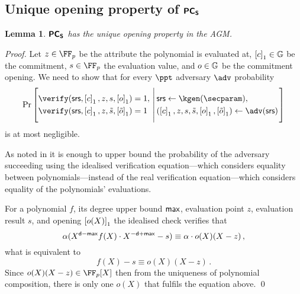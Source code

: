 \documentclass[runningheads,11pt]{llncs}
\newtheorem{lemma}[theorem]{Lemma} \newtheorem{corollary}[theorem]{Corollary}
\theoremstyle{definition} \newtheorem{definition}[theorem]{Definition}
\begin{document}
\subsection{Unique opening property of $\bm{\mathsf{PC}}_{\bm{\mathsf{S}}}$}
\begin{lemma}
\label{lem:pcoms_unique_op}
$\bm{\mathsf{PC}}_{\bm{\mathsf{S}}}$ has the unique opening property in the AGM. 
\end{lemma}
\begin{proof}
Let 
$z \in \FF_p$ be the attribute the polynomial is evaluated at,
$\left[c\right]_{1} \in \mathbb{G}$ be the commitment,  
$s \in \FF_p$ the evaluation value, and 
$o \in \mathbb{G}$ be the commitment opening. 
We need to show that for every $\ppt$ adversary $\adv$ probability
\[
  \Pr \left[
    \begin{aligned}
      & \verify(\srs, \gone{c}, z, s, \gone{o}) = 1, \\
      & \verify(\srs, \gone{c}, z, \tilde{s}, \gone{\tilde{o}}) = 1
    \end{aligned}
    \,\left|\, \vphantom{\begin{aligned}
          & \verify(\srs, \gone{c}, z, s, \gone{o}),\\
          & \verify(\srs, \gone{c}, z, \tilde{s}, \gone{\tilde{o}}) \\
          &o \neq \tilde{o})
		\end{aligned}}
      \begin{aligned}
        & \srs \gets \kgen(\secparam), \\
        & (\gone{c}, z, s, \tilde{s}, \gone{o}, \gone{\tilde{o}}) \gets \adv(\srs)
      \end{aligned}
    \right.\right]
\]
is at most negligible.

As noted in \cite[Lemma 2.2]{EPRINT:GabWilCio19} it is enough to upper bound the
probability of the adversary succeeding using the idealised verification
equation---which considers equality between polynomials---instead of the real
verification equation---which considers equality of the polynomials' evaluations.

For a polynomial $f$, its degree upper bound $\mathsf{max}$, evaluation point $z$,
evaluation result $s$, and opening $\left[o(X)\right]_{1}$ the idealised check verifies that
\begin{equation}
  \alpha (X^{\mathsf{d} - \mathsf{max}}f(X) \cdot X^{-\mathsf{d} + \mathsf{max}} -  s) \equiv \alpha \cdot o(X) (X - z)\,,
\end{equation}
what is equivalent to 
\begin{equation}
	f(X) -  s \equiv o(X) (X - z)\,.
	\label{eq:pcoms_idealised_check}
\end{equation}
Since $o(X)(X - z) \in \FF_p[X]$ then from the uniqueness of polynomial
composition, there is only one $o(X)$ that fulfils the equation above.
\qed
\end{proof}
\end{document}

